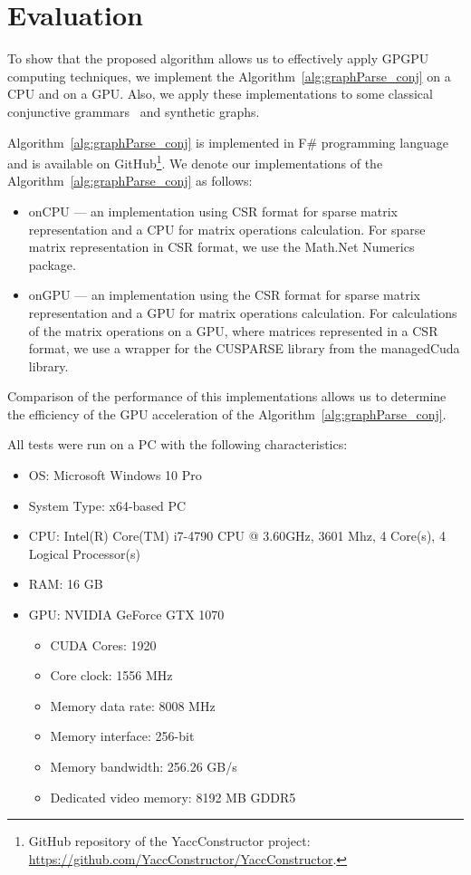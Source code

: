 \section{Evaluation} \label{section_evaluation}
To show that the proposed algorithm allows us to effectively apply GPGPU computing techniques, we implement the Algorithm~\ref{alg:graphParse_conj} on a CPU and on a GPU. Also, we apply these implementations to some classical conjunctive grammars~\cite{okhotin2001conjunctive} and synthetic graphs.

Algorithm~\ref{alg:graphParse_conj} is implemented in F\# programming language~\cite{fsharp} and is available on GitHub\footnote{GitHub repository of the YaccConstructor project: \url{https://github.com/YaccConstructor/YaccConstructor}.}. We denote our implementations of the Algorithm~\ref{alg:graphParse_conj} as follows:
\begin{itemize}
	\item onCPU --- an implementation using CSR format for sparse matrix representation and a CPU for matrix operations calculation. For sparse matrix representation in CSR format, we use the Math.Net Numerics package.
	\item onGPU --- an implementation using the CSR format for sparse matrix representation and a GPU for matrix operations calculation. For calculations of the matrix operations on a GPU, where matrices represented in a CSR format, we use a wrapper for the CUSPARSE library from the managedCuda library.
\end{itemize}

Comparison of the performance of this implementations allows us to determine the efficiency of the GPU acceleration of the Algorithm~\ref{alg:graphParse_conj}.

All tests were run on a PC with the following characteristics:
\begin{itemize}
	\item OS: Microsoft Windows 10 Pro
	\item System Type: x64-based PC
	\item CPU: Intel(R) Core(TM) i7-4790 CPU @ 3.60GHz, 3601 Mhz, 4 Core(s), 4 Logical Processor(s)
	\item RAM: 16 GB
	\item GPU: NVIDIA GeForce GTX 1070
	\begin{itemize}
		\item CUDA Cores:		1920 
		\item Core clock:		1556 MHz 
		\item Memory data rate:	8008 MHz
		\item Memory interface:	256-bit 
		\item Memory bandwidth:	256.26 GB/s
		\item Dedicated video memory:	8192 MB GDDR5
	\end{itemize}
\end{itemize}

